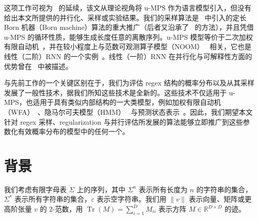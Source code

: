 \documentclass[twoside]{article}
\DeclareMathOperator{\Tr}{Tr}
\newcommand{\R}{\mathbb{R}}
\newcommand{\field}[1]{\R^{#1}}
\begin{document}
这项工作可视为~\citep{pestun2017a} 的延续，该文从理论视角将 u-MPS 作为语言模型引入，但没有给出本文所提供的并行化、采样或实验结果。我们的采样算法是~\citep{han2018} 中引入的定长 Born 机器（Born machine）算法的重大推广（后者又沿承了~\citep{ferris2012} 的方法），并且凭借 u-MPS 的循环性质，能够生成长度任意的离散序列。u-MPS 模型等价于二次加权有限自动机~\citep{bailly2011}，并在较小程度上与范数可观测算子模型（NOOM）~\citep{zhao2010} 相关，它也是线性（二阶）RNN 的一个实例~\citep{rabusseau2019}。线性（一阶）RNN 在并行化与可解释性方面的优势曾在~\citep{martin2018, foerster2017input} 中被描述。

与先前工作的一个关键区别在于，我们为评估 regex 结构的概率分布以及从其采样发展了一般性技术，据我们所知这些技术是全新的。这些技术不仅适用于 u-MPS，也适用于具有类似内部结构的一大类模型，例如加权有限自动机（WFA）~\citep{droste2009}、隐马尔可夫模型（HMM）~\citep{rabiner1986} 与预测状态表示~\citep{littman2002}。因此，我们期望本文针对 regex 采样、regularization 与并行评估所发展的算法能够立即推广到这些参数化有效概率分布的模型中的任何一个。
\section{背景}

我们考虑有限字母表 $\Sigma$ 上的序列，其中 $\Sigma^n$ 表示所有长度为 $n$ 的字符串的集合，$\Sigma^*$ 表示所有字符串的集合，$\varepsilon$ 表示空字符串。我们用 $\lVert v\rVert$ 表示向量、矩阵或更高阶张量 $v$ 的 2-范数，用 $\Tr(M)=\sum_{i=1}^D M_{ii}$ 表示方阵 $M\in\field{D\times D}$ 的迹。
\end{document}
